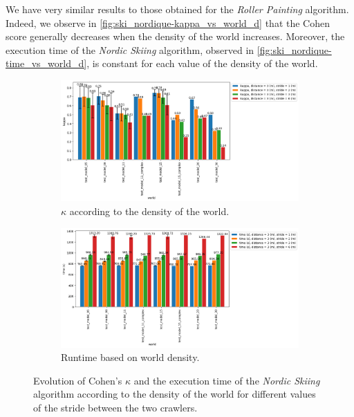 We have very similar results to those obtained for the \textit{Roller Painting} algorithm.
Indeed, we observe in \ref{fig:ski_nordique-kappa_vs_world_d} that the Cohen score generally decreases when the density of the world increases.
Moreover, the execution time of the \textit{Nordic Skiing} algorithm, observed in \ref{fig:ski_nordique-time_vs_world_d}, is constant for each value of the density of the world.

\begin{figure}[h!]
	\centering
	\begin{subfigure}[t]{0.99\linewidth}
		\includegraphics[width=\linewidth]{graphics/ski_nordique-kappa_vs_world_for_each_s.png}
		\caption{$\kappa$ according to the density of the world.}
		\label{fig:ski_nordique-kappa_vs_world_s}
	\end{subfigure}
	\hfill
	\begin{subfigure}[t]{0.99\linewidth}
		\includegraphics[width=\linewidth]{graphics/ski_nordique-time_vs_world_for_each_s.png}
		\caption{Runtime based on world density.}
		\label{fig:ski_nordique-time_vs_world_s}
	\end{subfigure}
	\caption{Evolution of Cohen's $\kappa$ and the execution time of the \textit{Nordic Skiing} algorithm according to the density of the world for different values of the stride between the two crawlers.}
	\label{fig:ski_nordique-world_s}
\end{figure}

